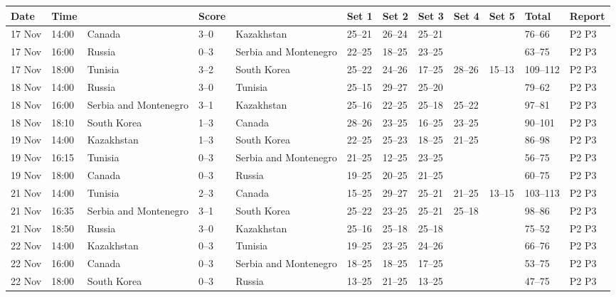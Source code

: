 \documentclass{article}
\begin{document}
\begin{tabular}{llllllllllll}
\toprule
Date & Time &  & Score &  & Set 1 & Set 2 & Set 3 & Set 4 & Set 5 & Total & Report \\
\midrule
17 Nov & 14:00 & Canada & 3–0 & Kazakhstan & 25–21 & 26–24 & 25–21 &  &  & 76–66 & P2 P3 \\
17 Nov & 16:00 & Russia & 0–3 & Serbia and Montenegro & 22–25 & 18–25 & 23–25 &  &  & 63–75 & P2 P3 \\
17 Nov & 18:00 & Tunisia & 3–2 & South Korea & 25–22 & 24–26 & 17–25 & 28–26 & 15–13 & 109–112 & P2 P3 \\
18 Nov & 14:00 & Russia & 3–0 & Tunisia & 25–15 & 29–27 & 25–20 &  &  & 79–62 & P2 P3 \\
18 Nov & 16:00 & Serbia and Montenegro & 3–1 & Kazakhstan & 25–16 & 22–25 & 25–18 & 25–22 &  & 97–81 & P2 P3 \\
18 Nov & 18:10 & South Korea & 1–3 & Canada & 28–26 & 23–25 & 16–25 & 23–25 &  & 90–101 & P2 P3 \\
19 Nov & 14:00 & Kazakhstan & 1–3 & South Korea & 22–25 & 25–23 & 18–25 & 21–25 &  & 86–98 & P2 P3 \\
19 Nov & 16:15 & Tunisia & 0–3 & Serbia and Montenegro & 21–25 & 12–25 & 23–25 &  &  & 56–75 & P2 P3 \\
19 Nov & 18:00 & Canada & 0–3 & Russia & 19–25 & 20–25 & 21–25 &  &  & 60–75 & P2 P3 \\
21 Nov & 14:00 & Tunisia & 2–3 & Canada & 15–25 & 29–27 & 25–21 & 21–25 & 13–15 & 103–113 & P2 P3 \\
21 Nov & 16:35 & Serbia and Montenegro & 3–1 & South Korea & 25–22 & 23–25 & 25–21 & 25–18 &  & 98–86 & P2 P3 \\
21 Nov & 18:50 & Russia & 3–0 & Kazakhstan & 25–16 & 25–18 & 25–18 &  &  & 75–52 & P2 P3 \\
22 Nov & 14:00 & Kazakhstan & 0–3 & Tunisia & 19–25 & 23–25 & 24–26 &  &  & 66–76 & P2 P3 \\
22 Nov & 16:00 & Canada & 0–3 & Serbia and Montenegro & 18–25 & 18–25 & 17–25 &  &  & 53–75 & P2 P3 \\
22 Nov & 18:00 & South Korea & 0–3 & Russia & 13–25 & 21–25 & 13–25 &  &  & 47–75 & P2 P3 \\
\bottomrule
\end{tabular}
\end{document}
